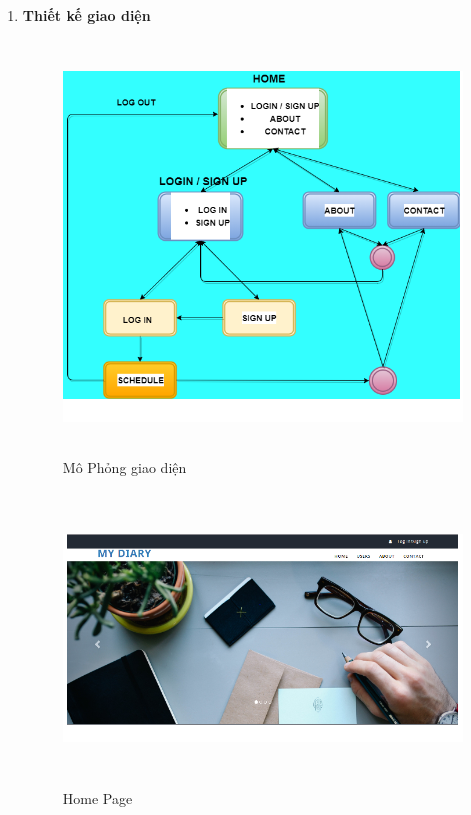 \documentclass[a4paper]{article}
\begin{document}
\begin{enumerate}
	\item \textbf{Thiết kế giao diện}

	\begin{figure}[!h]
	 			\centering
      			\includegraphics[height=310pt,width=300pt]{Images/h7.png}
	 		 	\caption{Mô Phỏng giao diện}
	 		 	\label{mainbook7}
	  		\end{figure}

	\begin{figure}[!h]
	 			\centering
      			\includegraphics[height=220pt,width=410pt]{Images/h8.png}
	 		 	\caption{Home Page}
	 		 	\label{mainbook8}
	  		\end{figure}



\end{enumerate}
\end{document}
